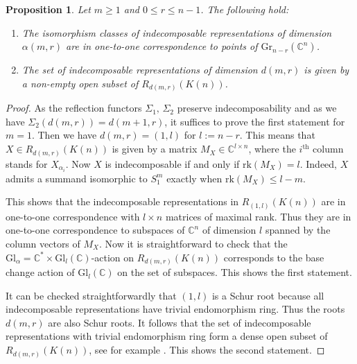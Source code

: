 \documentclass{amsart}
\newcommand{\sayD}[1]{\say[D]{#1}}
\newtheorem{proposition}[theorem]{Proposition}
\newcommand{\Gr}{\mathrm{Gr}}
\newcommand{\Gl}{\mathrm{Gl}}
\newcommand{\Ind}{\mathrm{Ind}}
\newcommand{\CC}{\mathbb{C}}
\newcommand{\rk}{\mathrm{rk}}
\begin{document}
\begin{proposition}
  \label{pro:indecomposables}
  Let $m\geq 1$ and $0\le r\le n-1$.
  The following hold:
  \begin{enumerate}
    \item The isomorphism classes of indecomposable representations of dimension $\alpha(m,r)$ are in one-to-one correspondence to points of $\Gr_{n-r}(\CC^n)$.
    \item The set of indecomposable representations of dimension $d(m,r)$ is given by a non-empty open subset of $R_{d(m,r)}(K(n))$. 
  \end{enumerate}
\end{proposition}
\begin{proof}
  As the reflection functors $\Sigma_1,\,\Sigma_2$ preserve indecomposability and as we have $\Sigma_2(d(m,r))=d(m+1,r)$, it suffices to prove the first statement for $m=1$.
  Then we have $d(m,r)=(1,l)$ for $l:=n-r$.
  This means that $X\in R_{d(m,r)}(K(n))$ is given by a matrix $M_X\in\CC^{l\times n}$, where the $i^{\mathrm{th}}$ column stands for $X_{\alpha_i}$.
  Now $X$ is indecomposable if and only if $\rk(M_X)=l$.
  Indeed, $X$ admits a summand isomorphic to $S_1^m$ exactly when $\rk(M_X)\leq l-m$.

  This shows that the indecomposable representations in $R_{(1,l)}(K(n))$ are in one-to-one correspondence with $l\times n$ matrices of maximal rank.
  Thus they are in one-to-one correspondence to subspaces of $\CC^n$ of dimension $l$ spanned by the column vectors of $M_X$.
  Now it is straightforward to check that the $\Gl_\alpha=\CC^\ast\times\Gl_l(\CC)$-action on $R_{d(m,r)}(K(n))$ corresponds to the base change action of $\Gl_l(\CC)$ on the set of subspaces.
  This shows the first statement.

  It can be checked straightforwardly that $(1,l)$ is a Schur root because all indecomposable representations have trivial endomorphism ring.
  Thus the roots $d(m,r)$ are also Schur roots.
  It follows that the set of indecomposable representations with trivial endomorphism ring form a dense open subset of $R_{d(m,r)}(K(n))$, see for example \cite{sch}.
  This shows the second statement.

\end{proof}
\end{document}
